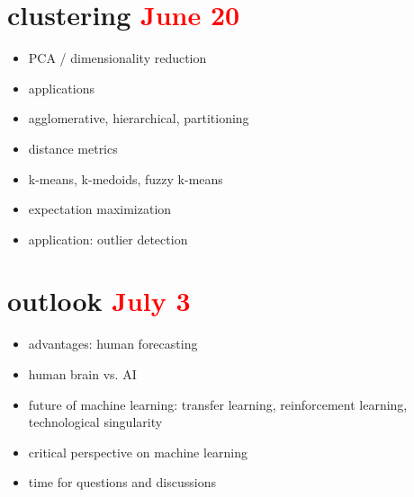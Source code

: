 \documentclass[a4paper]{article}
\begin{document}
\section{clustering \textcolor{red}{June 20}}
\begin{itemize}
\item PCA / dimensionality reduction
\item applications
\item agglomerative, hierarchical, partitioning
\item distance metrics
\item k-means, k-medoids, fuzzy k-means
\item expectation maximization
\item application: outlier detection
\end{itemize}

\section{outlook \textcolor{red}{July 3}}
\begin{itemize}
\item advantages: human forecasting
\item human brain vs. AI
\item future of machine learning: transfer learning, reinforcement learning, technological singularity
\item critical perspective on machine learning
\item time for questions and discussions
\end{itemize}
\end{document}
